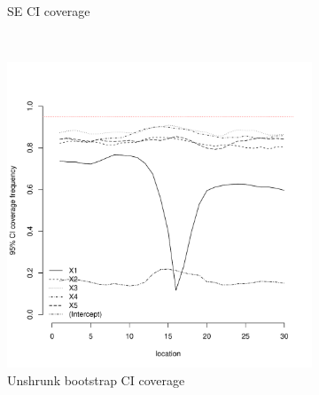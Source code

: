 \documentclass[authoryear, review, 11pt]{elsarticle}
\begin{document}
\begin{figure}
\begin{subfigure}[b]{0.45\textwidth}
		\caption{SE CI coverage}
	\end{subfigure}%
	\\%
	\begin{subfigure}[b]{0.45\textwidth}
	\centering
		\includegraphics[width=\textwidth]{../../figures/simulation/15.5.profile_unshrunk_bootstrap_coverage.pdf}
		\caption{Unshrunk bootstrap CI coverage}
	\end{subfigure}%
	~ %
	\begin{subfigure}[b]{0.45\textwidth}
	\centering

\end{subfigure}
\end{figure}
\end{document}
